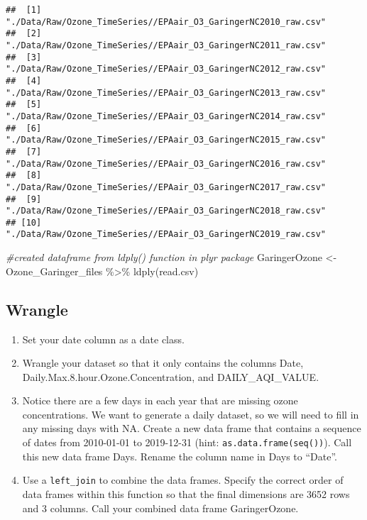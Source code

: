 \documentclass[
]{article}
\newenvironment{Shaded}{\begin{snugshade}}{\end{snugshade}}
\newcommand{\CommentTok}[1]{\textcolor[rgb]{0.56,0.35,0.01}{\textit{#1}}}
\newcommand{\FunctionTok}[1]{\textcolor[rgb]{0.00,0.00,0.00}{#1}}
\newcommand{\NormalTok}[1]{#1}
\newcommand{\OtherTok}[1]{\textcolor[rgb]{0.56,0.35,0.01}{#1}}
\newcommand{\SpecialCharTok}[1]{\textcolor[rgb]{0.00,0.00,0.00}{#1}}
\begin{document}
\begin{verbatim}
##  [1] "./Data/Raw/Ozone_TimeSeries//EPAair_O3_GaringerNC2010_raw.csv"
##  [2] "./Data/Raw/Ozone_TimeSeries//EPAair_O3_GaringerNC2011_raw.csv"
##  [3] "./Data/Raw/Ozone_TimeSeries//EPAair_O3_GaringerNC2012_raw.csv"
##  [4] "./Data/Raw/Ozone_TimeSeries//EPAair_O3_GaringerNC2013_raw.csv"
##  [5] "./Data/Raw/Ozone_TimeSeries//EPAair_O3_GaringerNC2014_raw.csv"
##  [6] "./Data/Raw/Ozone_TimeSeries//EPAair_O3_GaringerNC2015_raw.csv"
##  [7] "./Data/Raw/Ozone_TimeSeries//EPAair_O3_GaringerNC2016_raw.csv"
##  [8] "./Data/Raw/Ozone_TimeSeries//EPAair_O3_GaringerNC2017_raw.csv"
##  [9] "./Data/Raw/Ozone_TimeSeries//EPAair_O3_GaringerNC2018_raw.csv"
## [10] "./Data/Raw/Ozone_TimeSeries//EPAair_O3_GaringerNC2019_raw.csv"
\end{verbatim}

\begin{Shaded}
\begin{Highlighting}[]
\CommentTok{\#created dataframe from ldply() function in plyr package}
\NormalTok{GaringerOzone }\OtherTok{\textless{}{-}}\NormalTok{ Ozone\_Garinger\_files }\SpecialCharTok{\%\textgreater{}\%}
                 \FunctionTok{ldply}\NormalTok{(read.csv)}
\end{Highlighting}
\end{Shaded}

\hypertarget{wrangle}{%
\subsection{Wrangle}\label{wrangle}}

\begin{enumerate}
\def\labelenumi{\arabic{enumi}.}
\setcounter{enumi}{2}
\item
  Set your date column as a date class.
\item
  Wrangle your dataset so that it only contains the columns Date,
  Daily.Max.8.hour.Ozone.Concentration, and DAILY\_AQI\_VALUE.
\item
  Notice there are a few days in each year that are missing ozone
  concentrations. We want to generate a daily dataset, so we will need
  to fill in any missing days with NA. Create a new data frame that
  contains a sequence of dates from 2010-01-01 to 2019-12-31 (hint:
  \texttt{as.data.frame(seq())}). Call this new data frame Days. Rename
  the column name in Days to ``Date''.
\item
  Use a \texttt{left\_join} to combine the data frames. Specify the
  correct order of data frames within this function so that the final
  dimensions are 3652 rows and 3 columns. Call your combined data frame
  GaringerOzone.
\end{enumerate}
\end{document}
